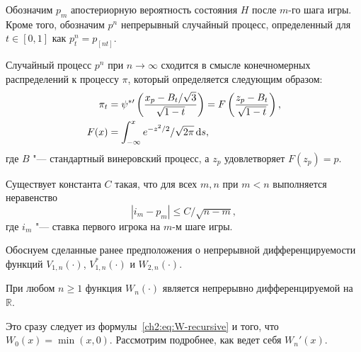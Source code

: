 {Обозначим $p_m$ апостериорную вероятность состояния $H$ после $m$-го шага игры.
Кроме того, обозначим $p^n$ непрерывный случайный процесс, определенный для $t \in [0, 1]$ как $p^n_t = p_{[nt]}$.

\begin{proposition}
  Случайный процесс $p^n$ при $n \rightarrow \infty$ сходится в смысле конечномерных распределений к процессу $\pi$, который определяется следующим образом:
  \begin{align*}
    \pi_t &= \psi^{*\prime} \left(
      \frac{x_p - B_t/\sqrt{3}}{\sqrt{1-t}}
    \right) =
    F\left( \frac{z_p - B_t}{\sqrt{1-t}} \right),\\
    F(x) &= \int_{-\infty}^x e^{-z^2/2}/\sqrt{2\pi} \mathop{}\!\mathrm{d} s,
  \end{align*}
  где $B$ "--- стандартный винеровский процесс, а $z_p$ удовлетворяет $F(z_p) = p$.
\end{proposition}

\begin{proposition}
  Существует константа $C$ такая, что для всех $m, n$ при $m < n$ выполняется неравенство
  \begin{equation*}
    | i_m - p_m | \leq C / \sqrt{n - m},
  \end{equation*}
  где $i_m$ "--- ставка первого игрока на $m$-м шаге игры.
\end{proposition}

Обоснуем сделанные ранее предположения о непрерывной дифференцируемости функций $V_{1,n}(\cdot)$, $V_{1,n}^*(\cdot)$ и $W_{2,n}(\cdot)$.

\begin{proposition}
  При любом $n \geqslant 1$ функция $W_n(\cdot)$ является непрерывно дифференцируемой на $\mathbb{R}$.
\end{proposition}
Это сразу следует из формулы~\eqref{ch2:eq:W-recursive} и того, что $W_0(x) = \min(x, 0)$.
Рассмотрим подробнее, как ведет себя $W_n'(x)$.

}
